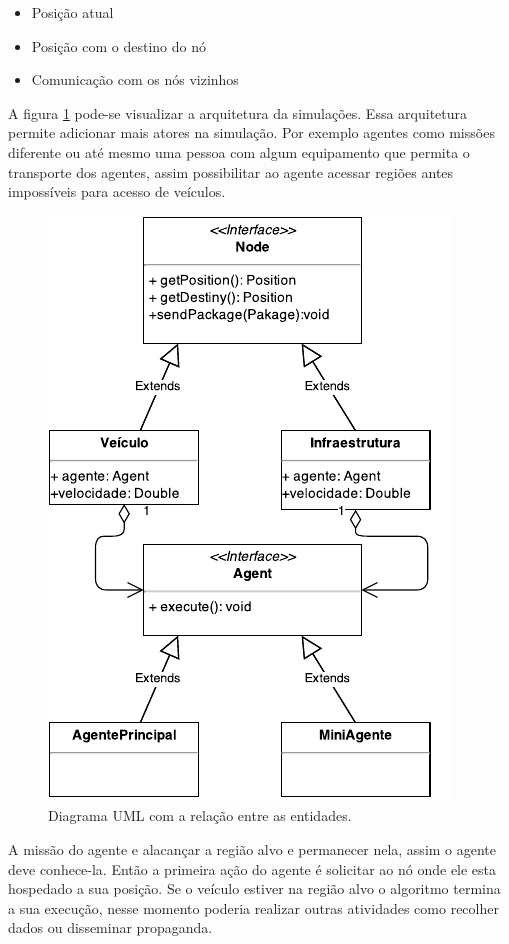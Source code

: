 \begin{itemize}
  \item Posição atual
  \item Posição com o destino do nó
  \item Comunicação com os nós vizinhos
\end{itemize}	

A figura \ref{fig:umlAtores} pode-se visualizar a arquitetura da simulações. Essa arquitetura permite adicionar mais atores na simulação. Por exemplo agentes como missões diferente ou até mesmo uma pessoa com algum equipamento que permita o transporte dos agentes, assim possibilitar ao agente acessar regiões antes impossíveis para acesso de veículos. 

\begin{figure}[htbp]
	\centering
	\includegraphics[scale=2]{metodologia/figuras/umlAtores.pdf}
	\caption{Diagrama UML com a relação entre as entidades.}
	\label{fig:umlAtores}
\end{figure}

A missão do agente e alacançar a região alvo e permanecer nela, assim o agente deve conhece-la. Então a primeira ação do agente é solicitar ao nó onde ele esta hospedado a sua posição. Se o veículo estiver na região alvo o algoritmo termina a sua execução, nesse momento poderia realizar outras atividades como recolher dados ou disseminar propaganda.

